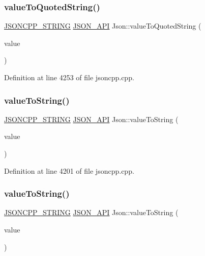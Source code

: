 \subsubsection{\texorpdfstring{value\+To\+Quoted\+String()}{valueToQuotedString()}}
{\footnotesize\ttfamily \hyperlink{config_8h_a1e723f95759de062585bc4a8fd3fa4be}{J\+S\+O\+N\+C\+P\+P\+\_\+\+S\+T\+R\+I\+NG} \hyperlink{config_8h_a1d61ffde86ce1a18fd83194ff0d9a206}{J\+S\+O\+N\+\_\+\+A\+PI} Json\+::value\+To\+Quoted\+String (\begin{DoxyParamCaption}\item[{const char $\ast$}]{value }\end{DoxyParamCaption})}



Definition at line 4253 of file jsoncpp.\+cpp.

\hypertarget{namespace_json_a4ed9732688b3c3dcaec309c9baddeac9}{}\label{namespace_json_a4ed9732688b3c3dcaec309c9baddeac9} 
\subsubsection{\texorpdfstring{value\+To\+String()}{valueToString()}\hspace{0.1cm}{\footnotesize\ttfamily [1/6]}}
{\footnotesize\ttfamily \hyperlink{config_8h_a1e723f95759de062585bc4a8fd3fa4be}{J\+S\+O\+N\+C\+P\+P\+\_\+\+S\+T\+R\+I\+NG} \hyperlink{config_8h_a1d61ffde86ce1a18fd83194ff0d9a206}{J\+S\+O\+N\+\_\+\+A\+PI} Json\+::value\+To\+String (\begin{DoxyParamCaption}\item[{\hyperlink{namespace_json_a08122e8005b706d982e48cca1e2119c7}{Int}}]{value }\end{DoxyParamCaption})}



Definition at line 4201 of file jsoncpp.\+cpp.

\hypertarget{namespace_json_a99bc401be7f8a09a8439f3e7219b1f12}{}\label{namespace_json_a99bc401be7f8a09a8439f3e7219b1f12} 
\subsubsection{\texorpdfstring{value\+To\+String()}{valueToString()}\hspace{0.1cm}{\footnotesize\ttfamily [2/6]}}
{\footnotesize\ttfamily \hyperlink{config_8h_a1e723f95759de062585bc4a8fd3fa4be}{J\+S\+O\+N\+C\+P\+P\+\_\+\+S\+T\+R\+I\+NG} \hyperlink{config_8h_a1d61ffde86ce1a18fd83194ff0d9a206}{J\+S\+O\+N\+\_\+\+A\+PI} Json\+::value\+To\+String (\begin{DoxyParamCaption}\item[{\hyperlink{namespace_json_a800fb90eb6ee8d5d62b600c06f87f7d4}{U\+Int}}]{value }\end{DoxyParamCaption})}




